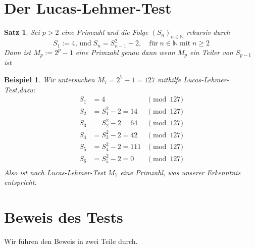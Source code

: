 \documentclass{article}
\newtheorem{theorem}{Satz}
\newtheorem{example}{Beispiel}
\newcommand{\Nature}{\ensuremath{\mathbb{N}}}
\begin{document}
\section{Der Lucas-Lehmer-Test}
\begin{theorem}\label{lucas}
	Sei $p > 2$ eine Primzahl und die Folge $(S_n)_{n \in \Nature}$ rekursiv durch
	\[
		S_1 := 4,\, \mbox{und} \; S_n = S_{n-1}^2 - 2,\quad \mbox{f\"{u}r} \; n \in \Nature \; \mbox{mit} \;n \geq 2
	\]
	Dann ist $M_p := 2^p - 1$ eine Primzahl genau dann wenn $M_p$ ein Teiler von $S_{p-1}$ ist
\end{theorem}

\begin{example}
	Wir untersuchen $M_7 = 2^7 - 1 = 127$ mithilfe \emph{Lucas-Lehmer-Test},dazu:
	\begin{align*}
			S_1 &= 4 & \pmod{127}\\
			S_2 &= S_1^2 - 2 = 14 & \pmod{127}\\
			S_3 &= S_2^2 - 2 = 64 & \pmod{127}\\
			S_4 &= S_3^2 - 2 = 42 & \pmod{127}\\
			S_5 &= S_4^2 - 2 = 111 & \pmod{127}\\
			S_6 &= S_5^2 - 2 = 0 & \pmod{127}\\
	\end{align*}
	Also ist nach \emph{Lucas-Lehmer-Test} $M_7$ eine Primzahl, was unserer Erkenntnis entspricht.
\end{example}
\section{Beweis des Tests}
Wir f\"{u}hren den Beweis in zwei Teile durch.\\
\end{document}
